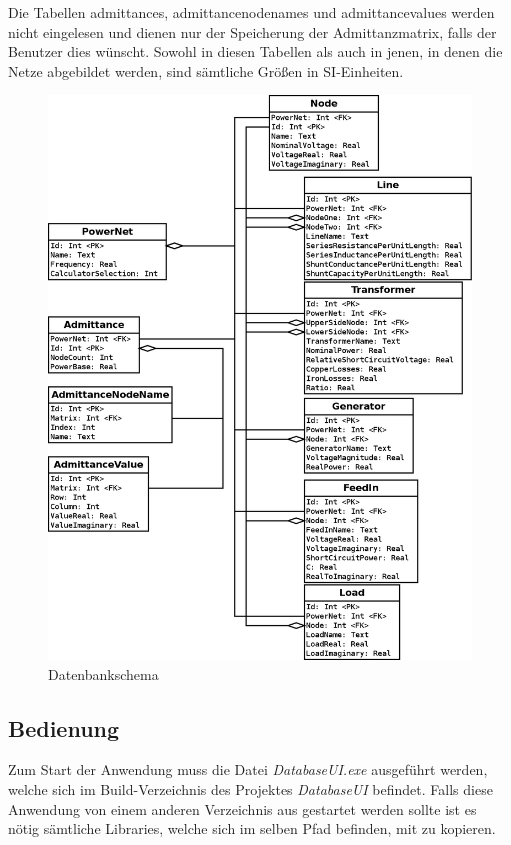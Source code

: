 \documentclass[12pt,a4paper]{article}
\begin{document}
	Die Tabellen admittances, admittancenodenames und admittancevalues werden nicht eingelesen und dienen nur der Speicherung der Admittanzmatrix, falls der Benutzer dies wünscht. Sowohl in diesen Tabellen als auch in jenen, in denen die Netze abgebildet werden, sind sämtliche Größen in SI-Einheiten.
	
	\begin{figure}
		\centering
		\includegraphics[scale=0.35]{pictures/database_schema}
		\caption{Datenbankschema}
		\label{fig:database_schema}
	\end{figure}
	
	\subsection{Bedienung}
	Zum Start der Anwendung muss die Datei \emph{DatabaseUI.exe} ausgeführt werden, welche sich im Build-Verzeichnis des Projektes \emph{DatabaseUI} befindet. Falls diese Anwendung von einem anderen Verzeichnis aus gestartet werden sollte ist es nötig sämtliche Libraries, welche sich im selben Pfad befinden, mit zu kopieren.
	
\end{document}
